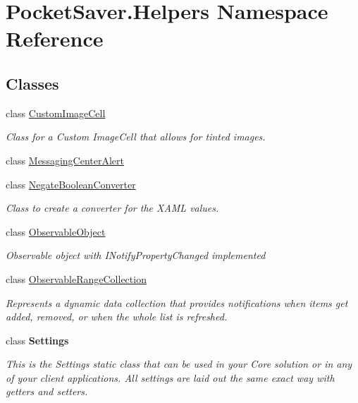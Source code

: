 \hypertarget{namespace_pocket_saver_1_1_helpers}{}\section{Pocket\+Saver.\+Helpers Namespace Reference}
\label{namespace_pocket_saver_1_1_helpers}
\subsection*{Classes}
\begin{DoxyCompactItemize}
\item 
class \hyperlink{class_pocket_saver_1_1_helpers_1_1_custom_image_cell}{Custom\+Image\+Cell}
\begin{DoxyCompactList}\small\item\em Class for a Custom Image\+Cell that allows for tinted images. \end{DoxyCompactList}\item 
class \hyperlink{class_pocket_saver_1_1_helpers_1_1_messaging_center_alert}{Messaging\+Center\+Alert}
\item 
class \hyperlink{class_pocket_saver_1_1_helpers_1_1_negate_boolean_converter}{Negate\+Boolean\+Converter}
\begin{DoxyCompactList}\small\item\em Class to create a converter for the X\+A\+ML values. \end{DoxyCompactList}\item 
class \hyperlink{class_pocket_saver_1_1_helpers_1_1_observable_object}{Observable\+Object}
\begin{DoxyCompactList}\small\item\em Observable object with I\+Notify\+Property\+Changed implemented \end{DoxyCompactList}\item 
class \hyperlink{class_pocket_saver_1_1_helpers_1_1_observable_range_collection}{Observable\+Range\+Collection}
\begin{DoxyCompactList}\small\item\em Represents a dynamic data collection that provides notifications when items get added, removed, or when the whole list is refreshed. \end{DoxyCompactList}\item 
class {\bfseries Settings}
\begin{DoxyCompactList}\small\item\em This is the Settings static class that can be used in your Core solution or in any of your client applications. All settings are laid out the same exact way with getters and setters. \end{DoxyCompactList}\end{DoxyCompactItemize}
